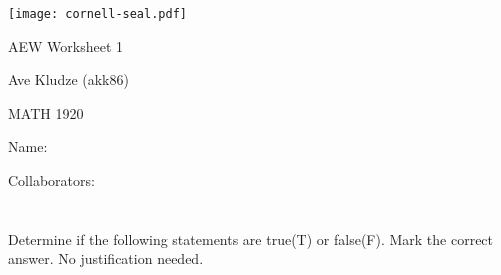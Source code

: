 \documentclass{article}
\begin{document}
\thispagestyle{empty}

\begin{minipage}[t]{1.1in}
{\vspace{-0.2in}
\texttt{[image: cornell-seal.pdf]}}
\end{minipage}
\hfill
\begin{minipage}[t]{1.8in}

{\large AEW Worksheet 1

\vspace{.1in}

Ave Kludze (akk86) \, 

\vspace{.1in}

MATH 1920}
\end{minipage}
\hfill
\begin{minipage}[t]{3.4in}

{\large Name: \hrulefill

\vspace{.15in}

Collaborators: \hrulefill

\vspace{.15in}

 \hrulefill 

}
\end{minipage}


\begin{flushright}

\end{flushright}

\vspace*{-33mm}


\parbox{82mm}{\footnotesize{
{\em 
\hskip 0.15in 
 

\hskip 0.15in  

}
} }


\vskip 12mm


\noindent {\bf } 
\noindent {\bf } 
\noindent {\bf } 

\section{}

Determine if the following statements are true(T) or false(F). Mark the correct answer. No justification needed.
\end{document}
